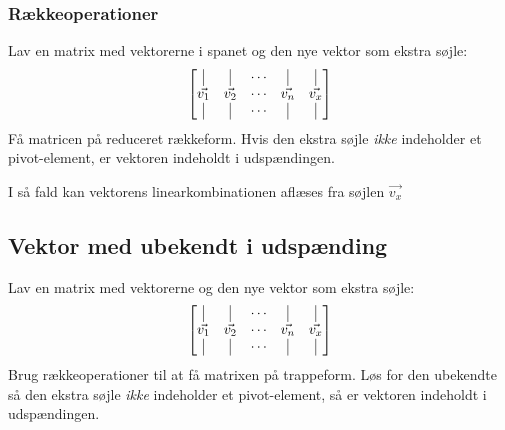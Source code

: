 \subsubsection{Rækkeoperationer}
Lav en matrix med vektorerne i spanet og den nye vektor som ekstra søjle:
\[
    \begin{bmatrix}
        \vline & \vline & \cdots & \vline & \vline \\
        \vec{v_1} & \vec{v_2} & \cdots & \vec{v_n} & \vec{v_x} \\
        \vline & \vline & \cdots & \vline & \vline \\
    \end{bmatrix}
\]
Få matricen på reduceret rækkeform. Hvis den ekstra søjle \emph{ikke} indeholder et pivot-element, er vektoren indeholdt i udspændingen.

I så fald kan vektorens linearkombinationen aflæses fra søjlen $\vec{v_x}$



\subsection{Vektor med ubekendt i udspænding}
Lav en matrix med vektorerne og den nye vektor som ekstra søjle:
\[
    \begin{bmatrix}
        \vline & \vline & \cdots & \vline & \vline \\
        \vec{v_1} & \vec{v_2} & \cdots & \vec{v_n} & \vec{v_x} \\
        \vline & \vline & \cdots & \vline & \vline \\
    \end{bmatrix}
\]
Brug rækkeoperationer til at få matrixen på trappeform. Løs for den ubekendte så den ekstra søjle \emph{ikke} indeholder et pivot-element, så er vektoren indeholdt i udspændingen.

